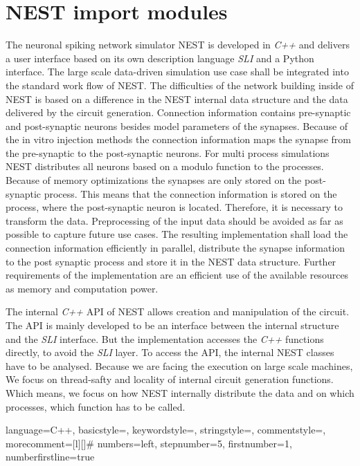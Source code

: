 \section{NEST import modules}
The neuronal spiking network simulator NEST is developed in \emph{C++} and delivers
a user interface based on its own description language \emph{SLI} and a Python interface.
The large scale data-driven simulation use case shall be integrated into the standard work flow of NEST.
The difficulties of the network building inside of NEST is based on a difference in 
the NEST internal data structure and the data delivered by the circuit generation.
Connection information contains pre-synaptic and post-synaptic neurons besides model parameters
of the synapses. Because of the in vitro injection methods the
connection information maps the synapse from the pre-synaptic to the post-synaptic neurons.
For multi process simulations NEST distributes all neurons based on a modulo function 
to the processes. Because of memory optimizations the synapses are only stored on the
post-synaptic process. This means that the connection information is stored
on the process, where the post-synaptic neuron is located.
Therefore, it is necessary to transform the data.
Preprocessing of the input data should be avoided as far as possible to capture
future use cases.
The resulting implementation shall load the connection information efficiently in parallel,
distribute the synapse information to the post synaptic process and store it in
the NEST data structure.
Further requirements of the implementation are an efficient use of the available resources as
memory and computation power. 

The internal \emph{C++} API of NEST allows creation and manipulation of the circuit.
The API is mainly developed to be an interface between the internal structure
and the \emph{SLI} interface. But the implementation accesses the \emph{C++} functions directly,
to avoid the \emph{SLI} layer. To access the API, the internal NEST classes
have to be analysed. Because we are facing the execution on large scale machines,
We focus on thread-safty and locality of internal circuit generation functions.
Which means, we focus on how NEST internally distribute the data and on which processes, which
function has to be called.


 {language=C++,
                basicstyle=\small\ttfamily,
                keywordstyle=\color{blue}\ttfamily,
                stringstyle=\color{red}\ttfamily,
                commentstyle=\color{green}\ttfamily,
                morecomment=[l][\color{magenta}]{\#}
                numbers=left,
  				stepnumber=5,    
  				firstnumber=1,
 				numberfirstline=true
}

